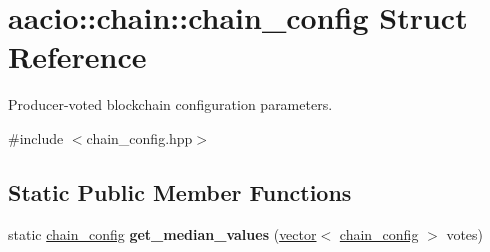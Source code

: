 \hypertarget{structaacio_1_1chain_1_1chain__config}{}\section{aacio\+:\+:chain\+:\+:chain\+\_\+config Struct Reference}
\label{structaacio_1_1chain_1_1chain__config}


Producer-\/voted blockchain configuration parameters.  




{\ttfamily \#include $<$chain\+\_\+config.\+hpp$>$}

\subsection*{Static Public Member Functions}
\begin{DoxyCompactItemize}
\item 
\mbox{\label{structaacio_1_1chain_1_1chain__config_abb51220777d3c21e3d3a6860c2466746}} 
static \mbox{\hyperlink{structaacio_1_1chain_1_1chain__config}{chain\+\_\+config}} {\bfseries get\+\_\+median\+\_\+values} (\mbox{\hyperlink{classstd_1_1vector}{vector}}$<$ \mbox{\hyperlink{structaacio_1_1chain_1_1chain__config}{chain\+\_\+config}} $>$ votes)
\end{DoxyCompactItemize}
